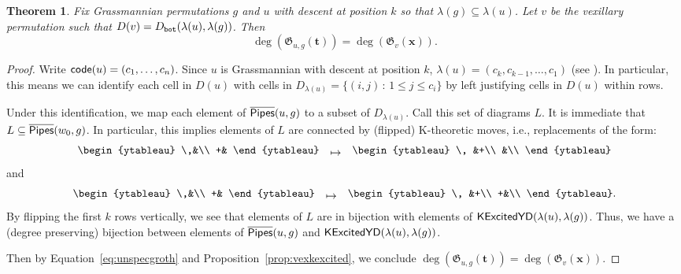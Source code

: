 \documentclass[12pt]{amsart}
\newtheorem{theorem}{Theorem}[section]
\theoremstyle{definition}
\theoremstyle{remark}
\numberwithin{equation}{section}
\newcommand{\code}{{\sf code}}
\newcommand{\maxexcited}{D_{\tt bot}}
\newcommand{\KPipes}{\overline{\sf Pipes}}
\newcommand{\kexcited}{{\sf KExcitedYD}}
\begin{document}
\begin{theorem}\label{thm:grassToVex}
Fix Grassmannian permutations $g$ and $u$ with descent at position $k$ so that $\lambda(g)\subseteq \lambda(u)$.  Let $v$ be the vexillary permutation such that $D(v)=\maxexcited(\lambda(u),\lambda(g))$.  Then
\[\deg(\mathfrak G_{u,g}(\mathbf t))=\deg(\mathfrak G_v(\mathbf x)).\]
\end{theorem}
\begin{proof}
Write $\code(u)=(c_1,\ldots,c_n)$.
Since $u$ is Grassmannian with descent at position $k$, $\lambda(u)=(c_k,c_{k-1},\ldots,c_1)$ (see \cite[Section~2.2]{Manivel}).  
In particular, this means we can identify each cell in $D(u)$ with cells in $D_{\lambda(u)}=\{(i,j)\,:  \,1\leq j\leq c_i\}$ by left justifying cells in $D(u)$ within rows.

Under this identification, we map each element of $\KPipes(u,g)$ to a subset of $D_{\lambda(u)}$.  Call this set of diagrams $L$.  It is immediate that $L\subseteq \KPipes(w_0,g)$.  In particular, this implies elements of $L$ are connected by (flipped) K-theoretic moves, i.e., replacements of the form:
\[
\begin{ytableau}
\,&\\
+&
\end{ytableau}
\hspace{1em}
 \raisebox{-.2em}{$\mapsto$}
 \hspace{1em}
\begin{ytableau}
\, &+\\
&\\
\end{ytableau}
\]
and
\[
\begin{ytableau}
\,&\\
+&
\end{ytableau}
\hspace{1em}
 \raisebox{-.2em}{$\mapsto$}
 \hspace{1em}
\begin{ytableau}
\, &+\\
+&\\
\end{ytableau}.
\]
By flipping the first $k$ rows vertically, we see that elements of $L$ are in bijection with elements of $\kexcited(\lambda(u),\lambda(g))$.  Thus, we have a (degree preserving) bijection between elements of $\KPipes(u,g)$  and $\kexcited(\lambda(u),\lambda(g))$.

Then by Equation~\eqref{eq:unspecgroth} and Proposition~\ref{prop:vexkexcited}, we conclude $\deg(\mathfrak G_{u,g}(\mathbf t))=\deg(\mathfrak G_v(\mathbf x))$.
\end{proof}
\end{document}
